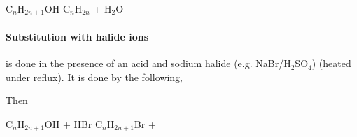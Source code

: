 	C$_n$H$_{2n+1}$OH \ch{->[H "$_3$" {} PO  "$_4$" {}][reflux]} C$_n$H$_{2n}$ + H$_2$O
	
	\paragraph{Substitution with halide ions} is done in the presence of an acid and sodium halide (e.g. NaBr/H$_2$SO$_4$) (heated under reflux). It is done by the following,
	
	\begin{center}

		Then		
		
		C$_n$H$_{2n+1}$OH + HBr \ch{->} C$_n$H$_{2n+1}$Br + 
	\end{center}
	
	